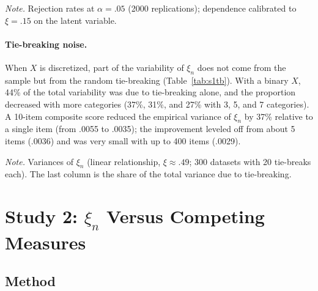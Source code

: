 \documentclass[man,mask,donotrepeattitle,floatsintext]{apa7}
\begin{document}
\begin{table}
\caption{Power of $\xi_n$ by Discretization of $X$ (Continuous $Y$)}
\label{tab:s1x}
\begin{threeparttable}
\small
\footnotesize\setlength{\tabcolsep}{3pt}

\begin{tablenotes}[flushleft]
\small
\item \textit{Note.} Rejection rates at $\alpha=.05$ (2000 replications); dependence calibrated to $\xi=.15$ on the latent variable.
\end{tablenotes}
\end{threeparttable}
\end{table}

\paragraph{Tie-breaking noise.} When $X$ is discretized, part of the variability of $\xi_n$ does not come from the sample but from the random tie-breaking (Table~\ref{tab:s1tb}). With a binary $X$, 44\% of the total variability was due to tie-breaking alone, and the proportion decreased with more categories (37\%, 31\%, and 27\% with 3, 5, and 7 categories). A 10-item composite score reduced the empirical variance of $\xi_n$ by 37\% relative to a single item (from .0055 to .0035); the improvement leveled off from about 5 items (.0036) and was very small with up to 400 items (.0029).

\begin{table}
\caption{Variability of $\xi_n$ Between Datasets and Due to Random Tie-Breaking ($n=100$)}
\label{tab:s1tb}
\begin{threeparttable}
\small

\begin{tablenotes}[flushleft]
\small
\item \textit{Note.} Variances of $\xi_n$ (linear relationship, $\xi\approx .49$; 300 datasets with 20 tie-breaks each). The last column is the share of the total variance due to tie-breaking.
\end{tablenotes}
\end{threeparttable}
\end{table}

\section{Study 2: $\xi_n$ Versus Competing Measures}

\subsection{Method}
\end{document}
